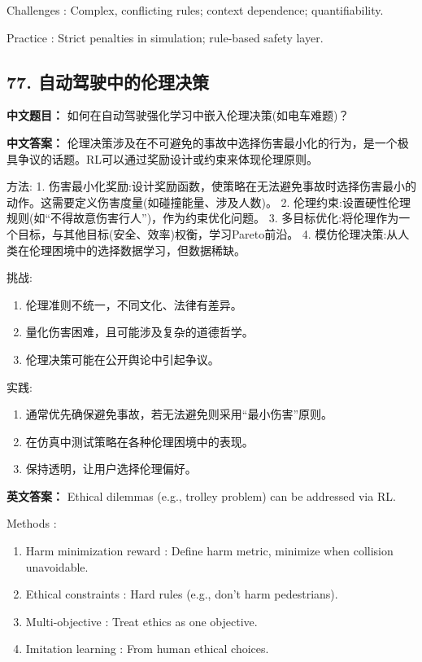 \documentclass[10pt,a4paper]{ctexart}
\begin{document}
 Challenges : Complex, conflicting rules; context dependence; quantifiability.

 Practice : Strict penalties in simulation; rule-based safety layer.

\subsection*{77. 自动驾驶中的伦理决策}
\textbf{中文题目：} 如何在自动驾驶强化学习中嵌入伦理决策(如电车难题)？

\textbf{中文答案：}  
伦理决策涉及在不可避免的事故中选择伤害最小化的行为，是一个极具争议的话题。RL可以通过奖励设计或约束来体现伦理原则。

 方法:
1.  伤害最小化奖励:设计奖励函数，使策略在无法避免事故时选择伤害最小的动作。这需要定义伤害度量(如碰撞能量、涉及人数)。
2.  伦理约束:设置硬性伦理规则(如“不得故意伤害行人”)，作为约束优化问题。
3.  多目标优化:将伦理作为一个目标，与其他目标(安全、效率)权衡，学习Pareto前沿。
4.  模仿伦理决策:从人类在伦理困境中的选择数据学习，但数据稀缺。

 挑战:
\begin{enumerate}
    \item 伦理准则不统一，不同文化、法律有差异。
    \item 量化伤害困难，且可能涉及复杂的道德哲学。
    \item 伦理决策可能在公开舆论中引起争议。
\end{enumerate}

 实践:
\begin{enumerate}
    \item 通常优先确保避免事故，若无法避免则采用“最小伤害”原则。
    \item 在仿真中测试策略在各种伦理困境中的表现。
    \item 保持透明，让用户选择伦理偏好。
\end{enumerate}

\textbf{英文答案：}  
Ethical dilemmas (e.g., trolley problem) can be addressed via RL.

 Methods :
\begin{enumerate}
    \item Harm minimization reward : Define harm metric, minimize when collision unavoidable.
    \item Ethical constraints : Hard rules (e.g., don't harm pedestrians).
    \item Multi-objective : Treat ethics as one objective.
    \item Imitation learning : From human ethical choices.
\end{enumerate}
\end{document}
